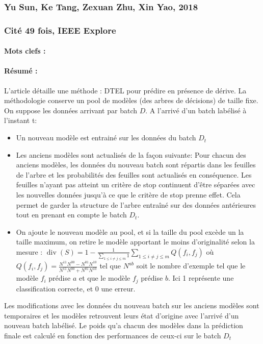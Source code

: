 \documentclass[11pt,a4paper]{report}
\begin{document}
\subsubsection{Yu Sun, Ke Tang, Zexuan Zhu, Xin Yao, 2018}

\subsubsection{Cité 49 fois, IEEE Explore}

\paragraph{Mots clefs :} 

\paragraph{Résumé :} L'article détaille une méthode : DTEL pour prédire en présence de dérive. La méthodologie conserve un pool de modèles (des arbres de décisions) de taille fixe. On suppose les données arrivant par batch $D$. 
A l'arrivé d'un batch labélisé à l'instant t: 
\begin{itemize}
	\item Un nouveau modèle est entrainé sur les données du batch $D_t$
	\item Les anciens modèles sont actualisés de la façon suivante: Pour chacun des anciens modèles, les données du nouveau batch sont répartis dans les feuilles de l'arbre et les probabilités des feuilles sont actualisés en conséquence. Les feuilles n'ayant pas atteint un critère de stop continuent d'être séparées avec les nouvelles données jusqu'à ce que le critère de stop prenne effet. Cela permet de garder la structure de l'arbre entraîné sur des données antérieures tout en prenant en compte le batch $D_t$.
	\item  On ajoute le nouveau modèle au pool, et si la taille du pool excède un la taille maximum, on retire le modèle apportant le moins d'originalité selon la mesure : $\operatorname{div}(S)=1-\frac{1}{\sum_{1 \leq i \neq j \leq m} 1} \sum_{1 \leq i \neq j \leq m} Q\left(f_{i}, f_{j}\right)$ où $Q\left(f_{i}, f_{j}\right)=\frac{N^{11} N^{00}-N^{01} N^{10}}{N^{11} N^{00}+N^{01} N^{10}}$ tel que $N^{ab}$ soit le nombre d'exemple tel que le modèle $f_i$ prédise $a$ et que le modèle $f_j$ prédise $b$. Ici 1 représente une classification correcte, et 0 une erreur.
\end{itemize}

Les  modifications avec les données du nouveau batch sur les anciens modèles sont temporaires et les modèles retrouvent leurs état d'origine avec l'arrivé d'un nouveau batch labélisé. Le poids qu'a chacun des modèles dans la prédiction finale est calculé en fonction des performances de ceux-ci sur le batch $D_t$
\end{document}
